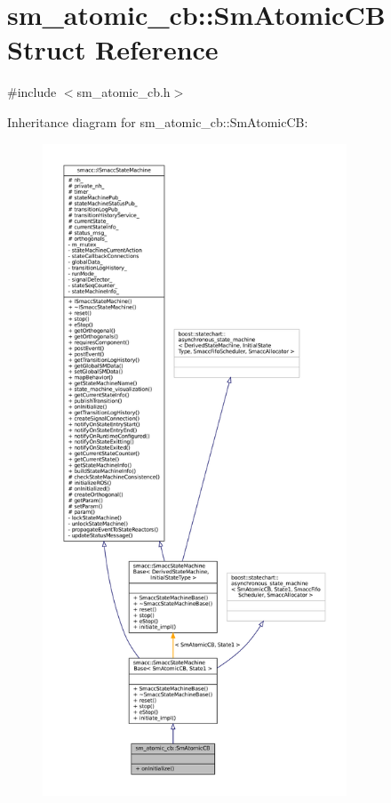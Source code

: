 \hypertarget{structsm__atomic__cb_1_1SmAtomicCB}{}\section{sm\+\_\+atomic\+\_\+cb\+:\+:Sm\+Atomic\+CB Struct Reference}
\label{structsm__atomic__cb_1_1SmAtomicCB}


{\ttfamily \#include $<$sm\+\_\+atomic\+\_\+cb.\+h$>$}



Inheritance diagram for sm\+\_\+atomic\+\_\+cb\+:\+:Sm\+Atomic\+CB\+:
\nopagebreak
\begin{figure}[H]
\begin{center}
\leavevmode
\includegraphics[height=550pt]{structsm__atomic__cb_1_1SmAtomicCB__inherit__graph}
\end{center}
\end{figure}


